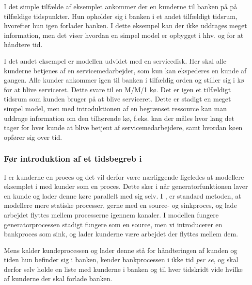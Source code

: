 I det simple tilfælde af eksemplet ankommer der en kunderne til banken på på 
tilfældige tidspunkter. Hun opholder sig i banken i et andet tilfældigt tidsrum, hvorefter hun 
igen forlader banken. I dette eksempel kan der ikke uddrages meget information, men det viser hvordan en simpel model er opbygget i hhv. \simpy og \pycsp for at håndtere tid.

I det andet eksempel er modellen udvidet med en servicedisk. Her skal alle kunderne betjenes af en 
servicemedarbejder, som kun kan ekspederes en kunde af gangen. Alle kunder ankommer igen til banken i tilfældig orden og 
stiller sig i kø for at blive serviceret. Dette  svare til en M/M/1 kø. Det er igen et tilfældigt tidsrum som kunden bruger på at blive serviceret.  Dette er stadigt en meget simpel model, men med introduktionen af en begrænset ressource kan man uddrage information om den tilhørende kø, f.eks. kan der måles hvor lang det tager for hver kunde at  blive betjent af servicemedarbejdere, samt hvordan køen opfører sig over tid. 

\subsubsection{Før introduktion af et tidsbegreb i \pycsp}
I \simpy er kunderne en proces og det vil derfor være nærliggende ligeledes at 
modellere eksemplet i \pycsp med kunder som en proces. Dette sker i  \simpy når
generatorfunktionen laver en kunde og lader  denne køre parallelt med sig selv. 
I \pycsp, er standard metoden, at modellere mere statiske processer, gerne med en source- og sinkproces, og lade arbejdet flyttes mellem processerne igennem kanaler. I \pycsp modellen fungere generatorprocessen stadigt fungere som en source, men vi introducerer en 
bankproces som sink, og lader kunderne være arbejdet der flyttes mellem dem. 

Mens \simpy kalder kundeprocessen og lader denne stå for håndteringen af 
kunden og tiden hun befinder sig i banken, kender bankprocessen i \pycsp ikke 
tid \emph{per se}, og skal derfor selv holde en liste med kunderne 
i banken og til hver tidskridt vide hvilke af kunderne der skal forlade 
banken. 

